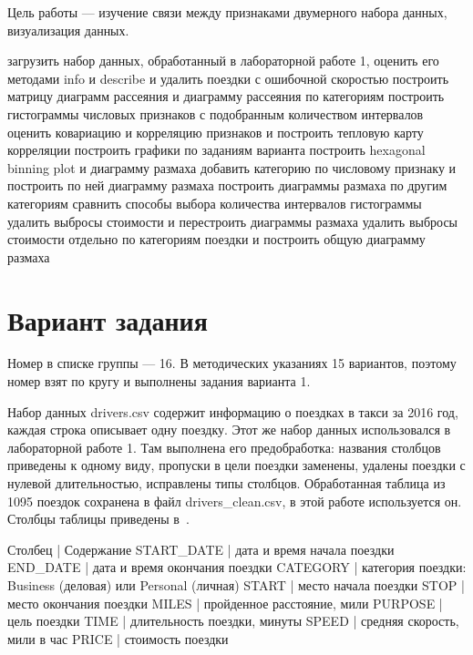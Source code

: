 \documentclass[a4paper,14pt]{extarticle}
\begin{document}
\maketitle
\suaitoc

\suaiintro

Цель работы — изучение связи между признаками двумерного набора данных, визуализация данных.

\suaitasks
загрузить набор данных, обработанный в лабораторной работе 1, оценить его методами info и describe и удалить поездки с ошибочной скоростью
построить матрицу диаграмм рассеяния и диаграмму рассеяния по категориям
построить гистограммы числовых признаков с подобранным количеством интервалов
оценить ковариацию и корреляцию признаков и построить тепловую карту корреляции
построить графики по заданиям варианта
построить hexagonal binning plot и диаграмму размаха
добавить категорию по числовому признаку и построить по ней диаграмму размаха
построить диаграммы размаха по другим категориям
сравнить способы выбора количества интервалов гистограммы
удалить выбросы стоимости и перестроить диаграммы размаха
удалить выбросы стоимости отдельно по категориям поездки и построить общую диаграмму размаха

\section{Вариант задания}

Номер в списке группы — 16. В методических указаниях 15 вариантов, поэтому номер взят по кругу и выполнены задания варианта 1.

Набор данных drivers.csv содержит информацию о поездках в такси за 2016 год, каждая строка описывает одну поездку. Этот же набор данных использовался в лабораторной работе 1. Там выполнена его предобработка: названия столбцов приведены к одному виду, пропуски в цели поездки заменены, удалены поездки с нулевой длительностью, исправлены типы столбцов. Обработанная таблица из 1095 поездок сохранена в файл drivers\_clean.csv, в этой работе используется он. Столбцы таблицы приведены в~.

Столбец | Содержание
START\_DATE | дата и время начала поездки
END\_DATE | дата и время окончания поездки
CATEGORY | категория поездки: Business (деловая) или Personal (личная)
START | место начала поездки
STOP | место окончания поездки
MILES | пройденное расстояние, мили
PURPOSE | цель поездки
TIME | длительность поездки, минуты
SPEED | средняя скорость, мили в час
PRICE | стоимость поездки
\end{document}
